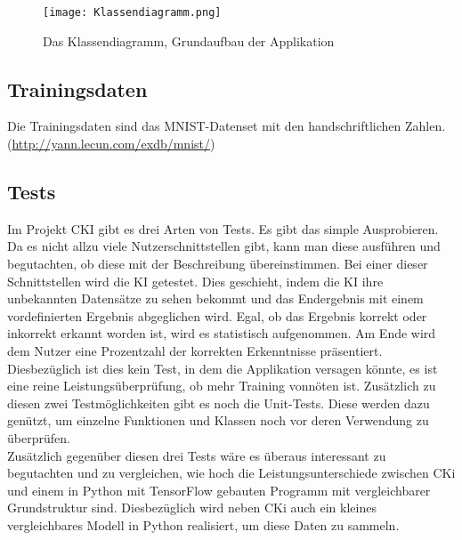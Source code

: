 \begin{figure}[H]
	\centering
	\texttt{[image: Klassendiagramm.png]}
	\caption{Das Klassendiagramm, Grundaufbau der Applikation}
	\label{fig:designklassendiagramm}
\end{figure}

\subsection{Trainingsdaten}
\label{sec:DesignTrainingsdaten}
Die Trainingsdaten sind das MNIST-Datenset mit den handschriftlichen Zahlen. (\url{http://yann.lecun.com/exdb/mnist/})

\subsection{Tests}
\label{sec:DesignTests}
Im Projekt CKI gibt es drei Arten von Tests. Es gibt das simple Ausprobieren. Da es nicht allzu viele Nutzerschnittstellen gibt, kann man diese ausführen und begutachten, ob diese mit der Beschreibung übereinstimmen.
Bei einer dieser Schnittstellen wird die KI getestet. Dies geschieht, indem die KI ihre unbekannten Datensätze zu sehen bekommt und das Endergebnis mit einem vordefinierten Ergebnis abgeglichen wird.
Egal, ob das Ergebnis korrekt oder inkorrekt erkannt worden ist, wird es statistisch aufgenommen. Am Ende wird dem Nutzer eine Prozentzahl der korrekten Erkenntnisse präsentiert. Diesbezüglich ist dies kein Test, in dem die Applikation versagen könnte, es ist eine reine Leistungsüberprüfung, ob mehr Training vonnöten ist.
Zusätzlich zu diesen zwei Testmöglichkeiten gibt es noch die Unit-Tests. Diese werden dazu genützt, um einzelne Funktionen und Klassen noch vor deren Verwendung zu überprüfen.
\\
Zusätzlich gegenüber diesen drei Tests wäre es überaus interessant zu begutachten und zu vergleichen, wie hoch die Leistungsunterschiede zwischen CKi und einem in Python mit TensorFlow gebauten Programm mit vergleichbarer Grundstruktur sind. Diesbezüglich wird neben CKi auch ein kleines vergleichbares Modell in Python realisiert, um diese Daten zu sammeln.
